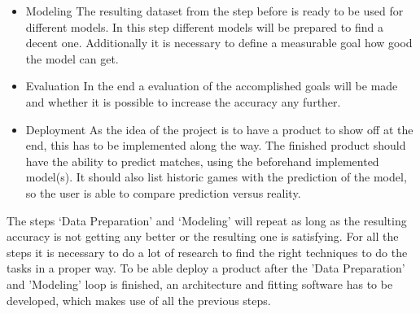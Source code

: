 \begin{itemize}
\item Modeling \newline
The resulting dataset from the step before is ready to be used for different models. In this step different models will be prepared to find a decent one. Additionally it is necessary to define a measurable goal how good the model can get.
\item Evaluation \newline
In the end a evaluation of the accomplished goals will be made and whether it is possible to increase the accuracy any further.  
\item Deployment \newline
As the idea of the project is to have a product to show off at the end, this has to be implemented along the way. The finished product should have the ability to predict matches, using the beforehand implemented model(s). It should also list historic games with the prediction of the model, so the user is able to compare prediction versus reality.

\end{itemize}

The steps `Data Preparation' and `Modeling' will repeat as long as the resulting accuracy is not getting any better or the resulting one is satisfying. For all the steps it is necessary to do a lot of research to find the right techniques to do the tasks in a proper way.  \newline
To be able deploy a product after the 'Data Preparation' and 'Modeling' loop is finished, an architecture and fitting software has to be developed, which makes use of all the previous steps.

